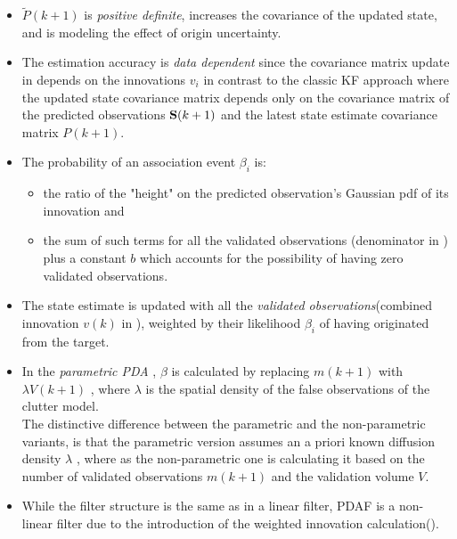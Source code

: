 \begin{itemize}
	\item $\tilde{P}(k+1)$ is \emph{positive definite}, increases the covariance of the updated state, and is modeling the effect of origin uncertainty.
	\item The estimation accuracy is \emph{data dependent} since the covariance matrix update in  depends on the innovations $v_i$ in contrast to the classic KF approach where the updated state covariance matrix depends only on the covariance matrix of the predicted observations $\mathbf{S}(k+1)$ and the latest state estimate covariance matrix $P(k+1)$.
	\item The probability of an association event $\beta_i$ is:
	\begin{itemize}
		\item the ratio of the "height" on the predicted observation's Gaussian pdf of its innovation and
		\item the sum of such terms for all the validated observations (denominator in ) plus a constant $b$ which accounts for the possibility of having zero validated observations.
	\end{itemize}
	\item The state estimate is updated with all the \emph{validated observations}(combined innovation $v(k)$ in ), weighted by their likelihood $\beta_i$ of having originated from the target.
	\item In the \emph{parametric PDA} , $\beta$ is calculated by replacing $m(k+1)$ with $\lambda V(k+1)$ , where $\lambda$ is the spatial density of the false observations of the clutter model. \\
	
	The distinctive difference between the parametric and the non-parametric variants, is that the parametric version assumes an a priori known diffusion density $\lambda$ , where as the non-parametric one is calculating it based on the number of validated observations $m(k+1)$ and the validation volume $V$.
	
	\item While the filter structure is the same as in a linear filter, PDAF is a non-linear filter due to the introduction of the weighted innovation calculation().
\end{itemize}


